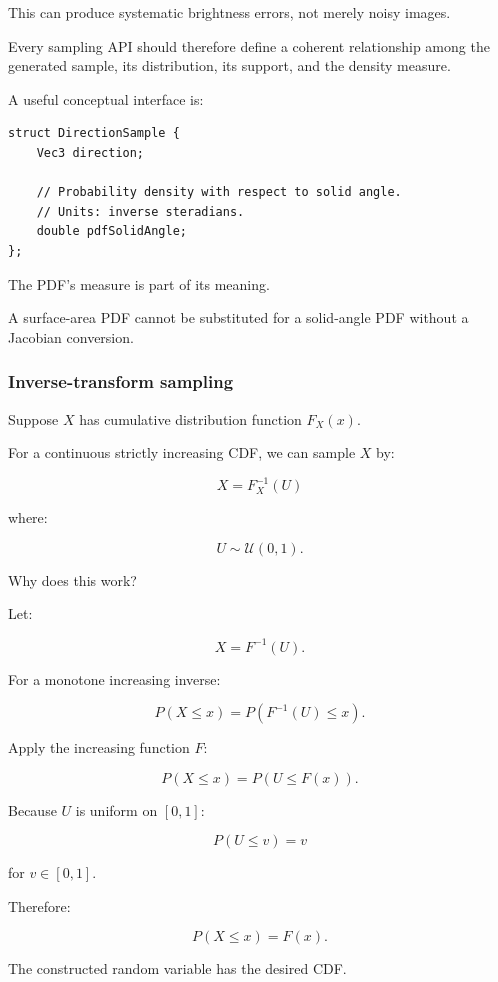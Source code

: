 This can produce systematic brightness errors, not merely noisy images.

Every sampling API should therefore define a coherent relationship among the generated sample, its distribution, its support, and the density measure.

A useful conceptual interface is:

\begin{verbatim}
struct DirectionSample {
    Vec3 direction;

    // Probability density with respect to solid angle.
    // Units: inverse steradians.
    double pdfSolidAngle;
};
\end{verbatim}

The PDF's measure is part of its meaning.

A surface-area PDF cannot be substituted for a solid-angle PDF without a Jacobian conversion.

\subsubsection{Inverse-transform sampling}\label{02-foundations-ii-ch029-inverse-transform-sampling}

\hypertarget{02-foundations-ii-ch029-inverse-transform-sampling}{}

Suppose \(X\) has cumulative distribution function \(F_X(x)\).

For a continuous strictly increasing CDF, we can sample \(X\) by:

\[
 \boxed{X=F_X^{-1}(U)}
\]

where:

\[
 U\sim\mathcal U(0,1).
\]

Why does this work?

Let:

\[
 X=F^{-1}(U).
\]

For a monotone increasing inverse:

\[
 P(X\le x) = P(F^{-1}(U)\le x).
\]

Apply the increasing function \(F\):

\[
 P(X\le x)=P(U\le F(x)).
\]

Because \(U\) is uniform on \([0,1]\):

\[
 P(U\le v)=v
\]

for \(v\in[0,1]\).

Therefore:

\[
 \boxed{P(X\le x)=F(x)}.
\]

The constructed random variable has the desired CDF.

